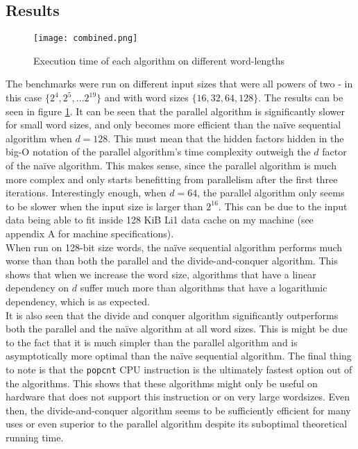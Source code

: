 \subsection{Results}
\begin{figure}
    \centering
    \texttt{[image: combined.png]}
    \caption{Execution time of each algorithm on different word-lengths}
    \label{fig:runningtime}
\end{figure}
The benchmarks were run on different input sizes that were all powers of two - in this case $\{2^4, 2^5, \dots 2^{19}\}$ and with word sizes $\{16, 32, 64, 128\}$. The results can be seen in figure \ref{fig:runningtime}. 
It can be seen that the parallel algorithm is significantly slower for small word sizes, and only becomes more efficient than the naïve sequential algorithm when $d=128$. This must mean that the hidden factors hidden in the big-O notation of the parallel algorithm's time complexity outweigh the $d$ factor of the naïve algorithm. This makes sense, since the parallel algorithm is much more complex and only starts benefitting from parallelism after the first three iterations. Interestingly enough, when $d=64$, the parallel algorithm only seems to be slower when the input size is larger than $2^{16}$. This can be due to the input data being able to fit inside 128 KiB Li1 data cache on my machine (see appendix A for machine specifications).\\
When run on 128-bit size words, the naïve sequential algorithm performs much worse than than both the parallel and the divide-and-conquer algorithm. This shows that when we increase the word size, algorithms that have a linear dependency on $d$ suffer much more than algorithms that have a logarithmic dependency, which is as expected.\\
It is also seen that the divide and conquer algorithm significantly outperforms both the parallel and the naïve algorithm at all word sizes. This is might be due to the fact that it is much simpler than the parallel algorithm and is asymptotically more optimal than the naïve sequential algorithm.
The final thing to note is that the \texttt{popcnt} CPU instruction is the ultimately fastest option out of the algorithms. This shows that these algorithms might only be useful on hardware that does not support this instruction or on very large wordsizes. Even then, the divide-and-conquer algorithm seems to be sufficiently efficient for many uses or even superior to the parallel algorithm despite its suboptimal theoretical running time.\\

